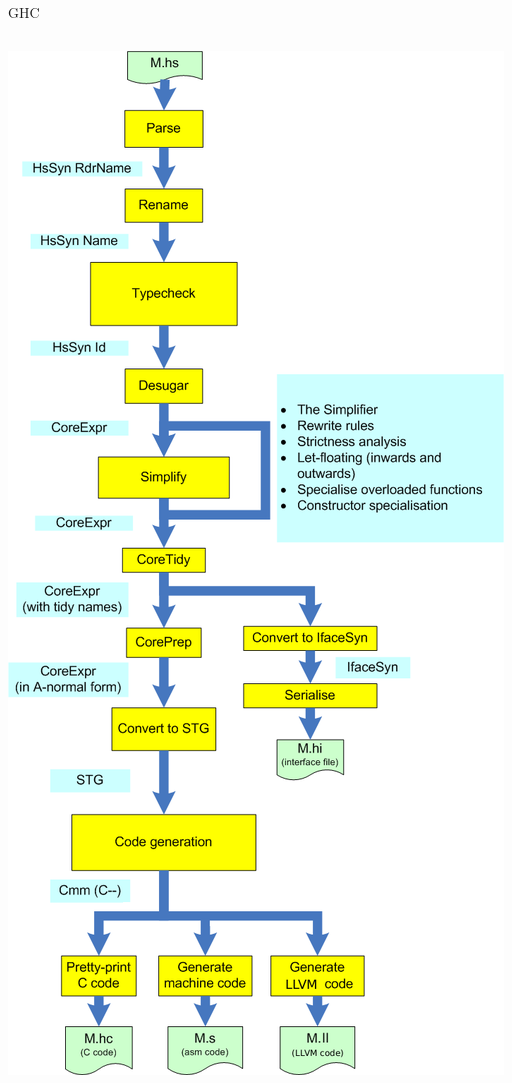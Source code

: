 \documentclass[10pt]{beamer}
\begin{document}
{
\begin{frame}{GHC}
\begin{columns}[T,onlytextwidth]
\includegraphics[scale=0.15]{images/ghc.png}


\end{columns}
\end{frame}}
\end{document}
